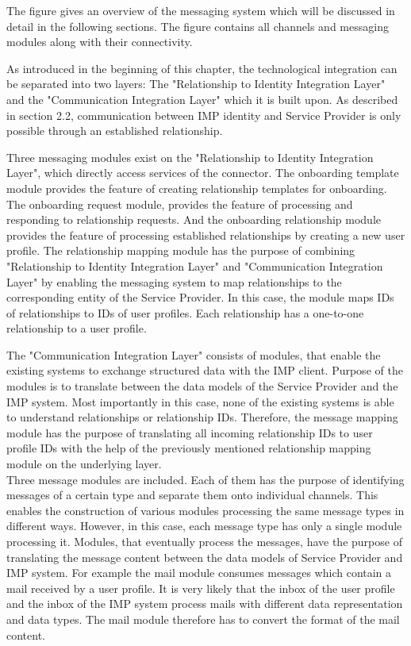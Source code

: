 The figure gives an overview of the messaging system which will be discussed in detail in the following sections. The figure contains all channels and messaging modules along with their connectivity.

As introduced in the beginning of this chapter, the technological integration can be separated into two layers: The "Relationship to Identity Integration Layer" and the "Communication Integration Layer" which it is built upon. As described in section 2.2, communication between IMP identity and Service Provider is only possible through an established relationship.

Three messaging modules exist on the "Relationship to Identity Integration Layer", which directly access services of the connector. The onboarding template module provides the feature of creating relationship templates for onboarding. The onboarding request module, provides the feature of processing and responding to relationship requests. And the onboarding relationship module provides the feature of processing established relationships by creating a new user profile. The relationship mapping module has the purpose of combining "Relationship to Identity Integration Layer" and "Communication Integration Layer" by enabling the messaging system to map relationships to the corresponding entity of the Service Provider. In this case, the module maps IDs of relationships to IDs of user profiles. Each relationship has a one-to-one relationship to a user profile.

The "Communication Integration Layer" consists of modules, that enable the existing systems to exchange structured data with the IMP client. Purpose of the modules is to translate between the data models of the Service Provider and the IMP system. Most importantly in this case, none of the existing systems is able to understand relationships or relationship IDs. Therefore, the message mapping module has the purpose of translating all incoming relationship IDs to user profile IDs with the help of the previously mentioned relationship mapping module on the underlying layer. \\
Three message modules are included. Each of them has the purpose of identifying messages of a certain type and separate them onto individual channels. This enables the construction of various modules processing the same message types in different ways. However, in this case, each message type has only a single module processing it. Modules, that eventually process the messages, have the purpose of translating the message content between the data models of Service Provider and IMP system. For example the mail module consumes messages which contain a mail received by a user profile. It is very likely that the inbox of the user profile and the inbox of the IMP system process mails with different data representation and data types. The mail module therefore has to convert the format of the mail content.

